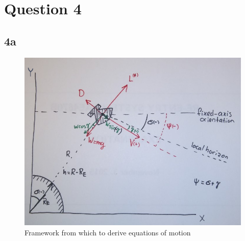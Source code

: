 \section{Question 4 }\label{sec:q4}    
\subsection{4a}
\begin{figure}[H]
    \centering
    \includegraphics[width=0.9\columnwidth]{Figures/picture_EOM.jpg}
    \caption{Framework from which to derive equations of motion}
    \label{fig:eom}
\end{figure}

